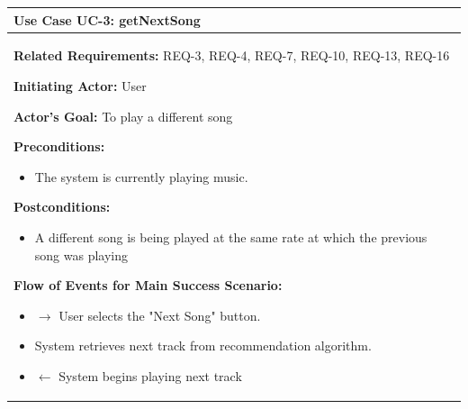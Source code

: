 \documentclass[letterpaper,english, 12pt]{scrreprt}
\begin{document}
\begin{center}
        \begin{tabular}{|C{15cm}|}
                \hline
                        \textbf{Use Case UC-3: getNextSong}\\
                \hline
                        \begin{flushleft}
                                \textbf{Related Requirements: } REQ-3, REQ-4, REQ-7, REQ-10, REQ-13, REQ-16
                        \end{flushleft}
                        \begin{flushleft}
                                \textbf{Initiating Actor: } User
                        \end{flushleft}
                        \begin{flushleft}
                                \textbf{Actor's Goal: } To play a different song
                        \end{flushleft}
                        \begin{flushleft}
                                \textbf{Preconditions: }
                        \end{flushleft}
                                \begin{itemize}
                                        \item The system is currently playing music.
                                \end{itemize}
                        \begin{flushleft}
                                \textbf{Postconditions: }
                        \end{flushleft}
                                \begin{itemize}
                                        \item A different song is being played at the same rate at which the previous song was playing
                                \end{itemize}
                        \begin{flushleft}
                                \textbf{Flow of Events for Main Success Scenario: }
                        \end{flushleft}
                                \begin{itemize}
                                        \item $\rightarrow$ User selects the "Next Song" button.
                                        \item System retrieves next track from recommendation algorithm.
                                        \item $\leftarrow$ System begins playing next track
                                \end{itemize}
                \hline
        \end{tabular}
\end{center}
\end{document}
